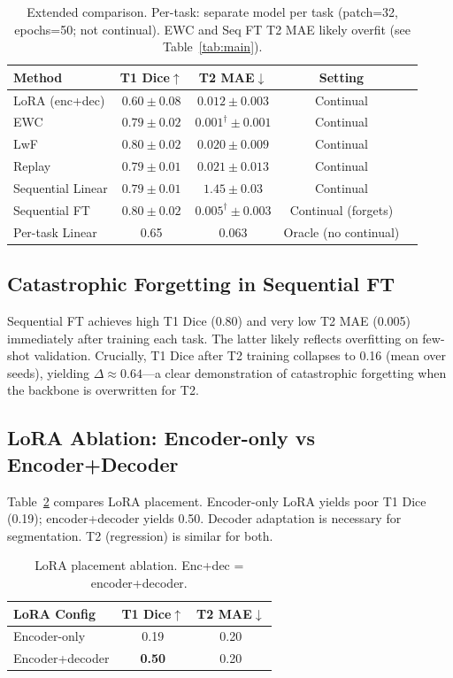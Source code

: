 \begin{table}[t]
\caption{Extended comparison. Per-task: separate model per task (patch=32, epochs=50; not continual). EWC and Seq FT T2 MAE likely overfit (see Table~\ref{tab:main}).}
\label{tab:extended}
\centering
\begin{tabular}{lcccl}
\toprule
Method & T1 Dice$\uparrow$ & T2 MAE$\downarrow$ & Setting \\
\midrule
LoRA (enc+dec) & $0.60 \pm 0.08$ & $\mathbf{0.012} \pm 0.003$ & Continual \\
EWC & $0.79 \pm 0.02$ & $0.001^\dagger \pm 0.001$ & Continual \\
LwF & $0.80 \pm 0.02$ & $0.020 \pm 0.009$ & Continual \\
Replay & $0.79 \pm 0.01$ & $0.021 \pm 0.013$ & Continual \\
Sequential Linear & $0.79 \pm 0.01$ & $1.45 \pm 0.03$ & Continual \\
Sequential FT & $0.80 \pm 0.02$ & $0.005^\dagger \pm 0.003$ & Continual (forgets) \\
Per-task Linear & 0.65 & 0.063 & Oracle (no continual) \\
\bottomrule
\end{tabular}
\end{table}

\subsection{Catastrophic Forgetting in Sequential FT}
\label{sec:forgetting}

Sequential FT achieves high T1 Dice (0.80) and very low T2 MAE (0.005) immediately after training each task. The latter likely reflects overfitting on few-shot validation. Crucially, T1 Dice after T2 training collapses to 0.16 (mean over seeds), yielding $\Delta \approx 0.64$---a clear demonstration of catastrophic forgetting when the backbone is overwritten for T2.

\subsection{LoRA Ablation: Encoder-only vs Encoder+Decoder}
\label{sec:lora_ablation}

Table~\ref{tab:lora_ablation} compares LoRA placement. Encoder-only LoRA yields poor T1 Dice (0.19); encoder+decoder yields 0.50. Decoder adaptation is necessary for segmentation. T2 (regression) is similar for both.

\begin{table}[t]
\caption{LoRA placement ablation. Enc+dec = encoder+decoder.}
\label{tab:lora_ablation}
\centering
\begin{tabular}{lcc}
\toprule
LoRA Config & T1 Dice$\uparrow$ & T2 MAE$\downarrow$ \\
\midrule
Encoder-only & 0.19 & 0.20 \\
Encoder+decoder & \textbf{0.50} & 0.20 \\
\bottomrule
\end{tabular}
\end{table}

